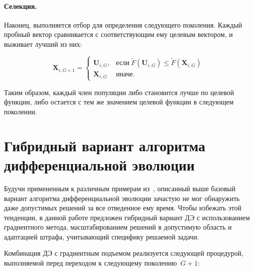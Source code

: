 \paragraph*{Селекция.}


Наконец, выполняется отбор для определения следующего поколения. Каждый пробный вектор сравнивается с соответствующим
ему целевым вектором, и выживает лучший из них:

\begin{equation}\label{eq:de_sel}
  \textbf{X}_{i,G+1} =
  \begin{cases}
    \textbf{U}_{i,G}, & \mbox{если} \ \tilde{F}(\textbf{U}_{i,G}) \leq \tilde{F}(\textbf{X}_{i,G}) \\
    \textbf{X}_{i,G} & \mbox{иначе}.
  \end{cases}
\end{equation}

Таким образом, каждый член популяции либо становится лучше по целевой функции, либо остается с тем же значением
целевой функции в следующем поколении.

\section{Гибридный вариант алгоритма дифференциальной эволюции}
Будучи примененным к различным примерам из~\cite{tyu:daor}, описанный выше базовый вариант алгоритма
дифференциальной эволюции зачастую не мог обнаружить даже допустимых решений за все отведенное ему время.
Чтобы избежать этой тенденции, в данной работе предложен гибридный вариант ДЭ с использованием градиентного метода,
масштабированием решений в допустимую область и адаптацией штрафа, учитывающий специфику решаемой задачи.

Комбинация ДЭ с градиентным подъемом реализуется следующей процедурой, выполняемой перед переходом к следующему поколению~$G+1$:

